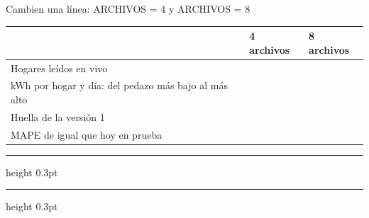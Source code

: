 \documentclass[10pt,letterpaper]{article}
\newcommand{\renglon}{\vspace{6mm}\hrule height 0.3pt\relax}
\begin{document}
\begin{caja}{Cambien una línea: ARCHIVOS = 4 y ARCHIVOS = 8}
\begin{tabularx}{\linewidth}{|p{7.2cm}|X|X|}\hline
\textbf{\small } & \textbf{\small 4 archivos} & \textbf{\small 8 archivos}\\\hline
\rule{0pt}{7mm}Hogares leídos en vivo &  & \\\hline
\rule{0pt}{7mm}kWh por hogar y día: del pedazo más bajo al más alto &  & \\\hline
\rule{0pt}{7mm}Huella de la versión 1 &  & \\\hline
\rule{0pt}{7mm}MAPE de \guillemotleft{}igual que hoy\guillemotright{} en prueba &  & \\\hline
\end{tabularx}
\par\vspace{3mm}{\small\bfseries ¿Qué cambió y qué no? ¿Por qué?}\renglon\renglon
\end{caja}
\end{document}
